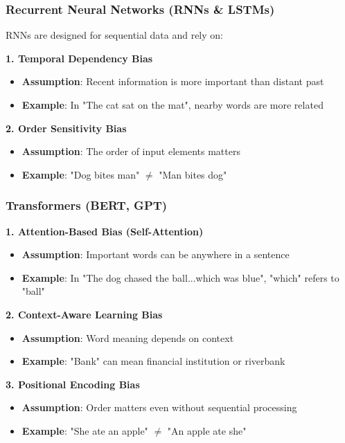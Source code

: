 \subsubsection{Recurrent Neural Networks (RNNs \& LSTMs)}
RNNs are designed for sequential data and rely on:

\textbf{1. Temporal Dependency Bias}
\begin{itemize}
    \item \textbf{Assumption}: Recent information is more important than distant past
    \item \textbf{Example}: In "The cat sat on the mat", nearby words are more related
\end{itemize}

\textbf{2. Order Sensitivity Bias}
\begin{itemize}
    \item \textbf{Assumption}: The order of input elements matters
    \item \textbf{Example}: "Dog bites man" $\neq$ "Man bites dog"
\end{itemize}

\subsubsection{Transformers (BERT, GPT)}

\textbf{1. Attention-Based Bias (Self-Attention)}
\begin{itemize}
    \item \textbf{Assumption}: Important words can be anywhere in a sentence
    \item \textbf{Example}: In "The dog chased the ball...which was blue", "which" refers to "ball"
\end{itemize}

\textbf{2. Context-Aware Learning Bias}
\begin{itemize}
    \item \textbf{Assumption}: Word meaning depends on context
    \item \textbf{Example}: "Bank" can mean financial institution or riverbank
\end{itemize}

\textbf{3. Positional Encoding Bias}
\begin{itemize}
    \item \textbf{Assumption}: Order matters even without sequential processing
    \item \textbf{Example}: "She ate an apple" $\neq$ "An apple ate she"
\end{itemize}

